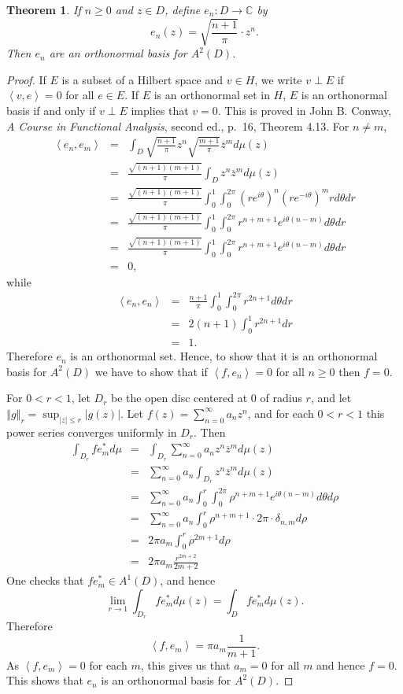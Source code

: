 \documentclass{article}
\newcommand{\inner}[2]{\left\langle #1, #2 \right\rangle}
\newcommand{\norm}[1]{\left\Vert #1 \right\Vert}
\newtheorem{theorem}{Theorem}
\begin{document}
\begin{theorem}
If $n \geq 0$ and $z \in D$, define $e_n:D \to \mathbb{C}$ by 
\[
e_n(z)=\sqrt{\frac{n+1}{\pi}} \cdot z^n.
\]
Then $e_n$ are an orthonormal basis for $A^2(D)$.
\end{theorem}
\begin{proof}
If $E$ is a subset of a Hilbert space and $v \in H$, we write $v \perp E$ if $\inner{v}{e}=0$ for all $e \in E$. If $E$ is an orthonormal set in $H$, $E$ is an orthonormal basis
if and only if $v \perp E$ implies that $v=0$. This is proved in John B. Conway, {\em A Course in Functional Analysis}, second ed., p.~16, Theorem 4.13.
For $n \neq m$,
\begin{eqnarray*}
\inner{e_n}{e_m}&=&\int_D \sqrt{\frac{n+1}{\pi}} z^n \sqrt{\frac{m+1}{\pi}} \overline{z}^m d\mu(z)\\
&=&\frac{ \sqrt{(n+1)(m+1)}}{\pi} \int_D z^n \overline{z}^m d\mu(z)\\
&=&\frac{ \sqrt{(n+1)(m+1)}}{\pi} \int_0^1 \int_0^{2\pi}  (re^{i\theta})^n (re^{-i\theta})^m r d\theta dr\\
&=&\frac{ \sqrt{(n+1)(m+1)}}{\pi} \int_0^1 \int_0^{2\pi}  r^{n+m+1} e^{i\theta(n-m)} d\theta dr\\
&=&\frac{ \sqrt{(n+1)(m+1)}}{\pi} \int_0^1 \int_0^{2\pi}  r^{n+m+1} e^{i\theta(n-m)} d\theta dr\\
&=&0,
\end{eqnarray*}
while
\begin{eqnarray*}
\inner{e_n}{e_n}&=&\frac{n+1}{\pi} \int_0^1 \int_0^{2\pi}  r^{2n+1} d\theta dr\\
&=&2(n+1)\int_0^1 r^{2n+1} dr\\
&=&1.
\end{eqnarray*}
Therefore $e_n$ is an orthonormal set. Hence, to show that it is an orthonormal basis for $A^2(D)$ we have to show that if $\inner{f}{e_n}=0$ for all $n \geq 0$ then
$f=0$.

For $0<r<1$, let $D_r$ be the open disc centered at $0$ of radius $r$, and let $\norm{g}_r=\sup_{|z| \leq r} |g(z)|$. 
Let $f(z)=\sum_{n=0}^\infty a_n z^n$, and for each $0<r<1$ this power series converges uniformly in $D_r$. Then
\begin{eqnarray*}
\int_{D_r} f e_m^* d\mu&=&\int_{D_r} \sum_{n=0}^\infty a_n z^n \overline{z}^m d\mu(z)\\
&=&\sum_{n=0}^\infty a_n \int_{D_r} z^n \overline{z}^m d\mu(z)\\
&=&\sum_{n=0}^\infty a_n \int_0^r \int_0^{2\pi} \rho^{n+m+1} e^{i\theta(n-m)} d\theta d\rho\\
&=&\sum_{n=0}^\infty a_n \int_0^r \rho^{n+m+1} \cdot 2\pi \cdot \delta_{n,m} d\rho\\
&=&2\pi a_m \int_0^r \rho^{2m+1} d\rho \\
&=&2\pi a_m \frac{r^{2m+2}}{2m+2}
\end{eqnarray*}
One checks that $f e_m^* \in A^1(D)$, and hence 
\[
\lim_{r \to 1} \int_{D_r} f e_m^* d\mu(z) = \int_D f e_m^* d\mu(z).
\]
Therefore
\[
\inner{f}{e_m}= \pi a_m \frac{1}{m+1}.
\]
As $\inner{f}{e_m}=0$ for each $m$, this gives us that $a_m=0$ for all $m$ and hence $f=0$. This shows that $e_n$ is an orthonormal basis for $A^2(D)$.
\end{proof}
\end{document}
